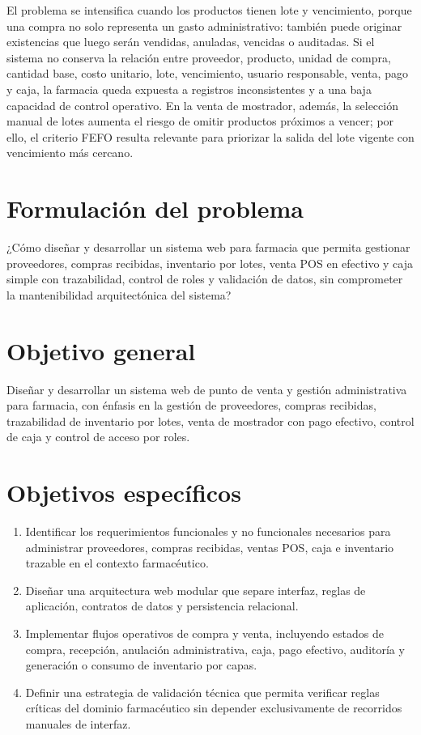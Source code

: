 El problema se intensifica cuando los productos tienen lote y vencimiento, porque una compra no solo representa un gasto administrativo: también puede originar existencias que luego serán vendidas, anuladas, vencidas o auditadas. Si el sistema no conserva la relación entre proveedor, producto, unidad de compra, cantidad base, costo unitario, lote, vencimiento, usuario responsable, venta, pago y caja, la farmacia queda expuesta a registros inconsistentes y a una baja capacidad de control operativo. En la venta de mostrador, además, la selección manual de lotes aumenta el riesgo de omitir productos próximos a vencer; por ello, el criterio FEFO resulta relevante para priorizar la salida del lote vigente con vencimiento más cercano.

\section{Formulación del problema}

¿Cómo diseñar y desarrollar un sistema web para farmacia que permita gestionar proveedores, compras recibidas, inventario por lotes, venta POS en efectivo y caja simple con trazabilidad, control de roles y validación de datos, sin comprometer la mantenibilidad arquitectónica del sistema?

\section{Objetivo general}

Diseñar y desarrollar un sistema web de punto de venta y gestión administrativa para farmacia, con énfasis en la gestión de proveedores, compras recibidas, trazabilidad de inventario por lotes, venta de mostrador con pago efectivo, control de caja y control de acceso por roles.

\section{Objetivos específicos}

\begin{enumerate}[label=\arabic*.]
  \item Identificar los requerimientos funcionales y no funcionales necesarios para administrar proveedores, compras recibidas, ventas POS, caja e inventario trazable en el contexto farmacéutico.
  \item Diseñar una arquitectura web modular que separe interfaz, reglas de aplicación, contratos de datos y persistencia relacional.
  \item Implementar flujos operativos de compra y venta, incluyendo estados de compra, recepción, anulación administrativa, caja, pago efectivo, auditoría y generación o consumo de inventario por capas.
  \item Definir una estrategia de validación técnica que permita verificar reglas críticas del dominio farmacéutico sin depender exclusivamente de recorridos manuales de interfaz.
\end{enumerate}

